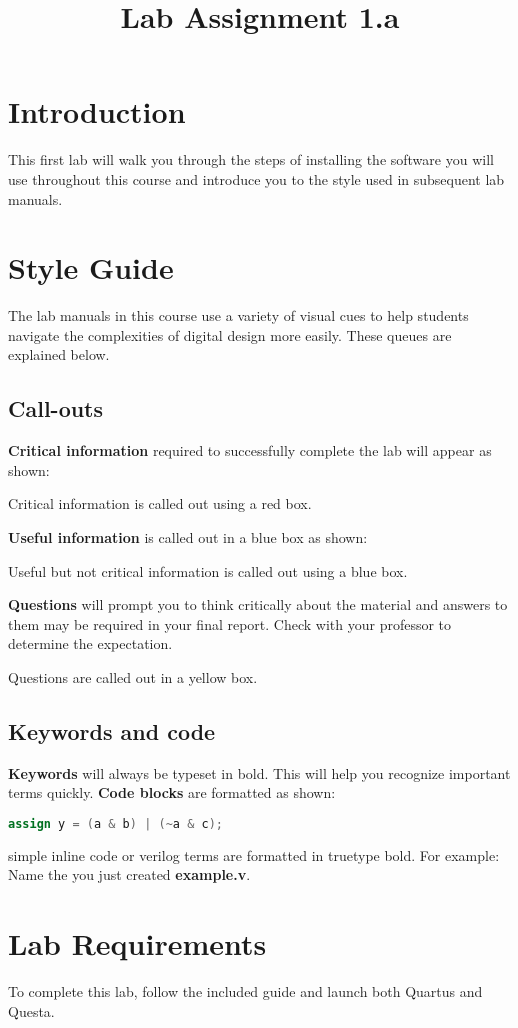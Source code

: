 \documentclass[12pt]{labmanual}
\title{Lab Assignment 1.a}
\author{}
\date{}
\begin{document}
\maketitle
\section{Introduction}
This first lab will walk you through the steps of installing the software you will use throughout this course and introduce you to the style used in subsequent lab manuals.
\section{Style Guide}
The lab manuals in this course use a variety of visual cues to help students navigate the complexities of digital design more easily. These queues are explained below.
\subsection{Call-outs}
\textbf{Critical information} required to successfully complete the lab will appear as shown:
\begin{important}[frametitle={Critical Info}]
Critical information is called out using a red box.
\end{important}
\textbf{Useful information} is called out in a blue box as shown:
\begin{extra}[frametitle={Useful Information}]
    Useful but not critical information is called out using a blue box.
\end{extra}
\textbf{Questions} will prompt you to think critically about the material and answers to them may be required in your final report. Check with your professor to determine the expectation.
\vspace{1em}
\begin{question}
Questions are called out in a yellow box.
\end{question}
\subsection{Keywords and code}
\textbf{Keywords} will always be typeset in bold. This will help you recognize important terms quickly. \textbf{Code blocks} are formatted as shown:
\begin{lstlisting}[language=Verilog]
    assign y = (a & b) | (~a & c);
\end{lstlisting}
simple inline code or verilog terms are formatted in truetype bold. For example: Name the  you just created \textbf{example.v}.
\section{Lab Requirements}
\begin{question}
    To complete this lab, follow the included guide and launch both Quartus and Questa.
\end{question}

\end{document}

